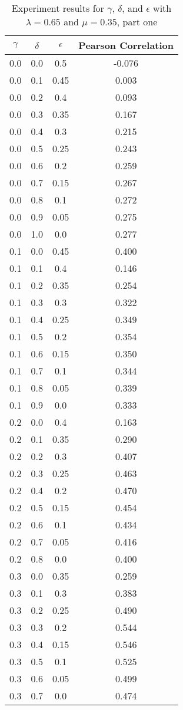 \documentclass{article}
\begin{document}
\begin{table}[h!]
\centering
\begin{tabular}{|c|c|c||c|}
	\hline
	$\gamma$ & $\delta$ & $\epsilon$ & Pearson Correlation \\
	\hline
	\hline
	0.0 & 0.0 & 0.5 & -0.076 \\
	0.0 & 0.1 & 0.45 & 0.003 \\
	0.0 & 0.2 & 0.4 & 0.093 \\
	0.0 & 0.3 & 0.35 & 0.167 \\
	0.0 & 0.4 & 0.3 & 0.215 \\ 
	0.0 & 0.5 & 0.25 & 0.243 \\
	0.0 & 0.6 & 0.2 & 0.259 \\
	0.0 & 0.7 & 0.15 & 0.267 \\
	0.0 & 0.8 & 0.1 & 0.272 \\
	0.0 & 0.9 & 0.05 & 0.275 \\
	0.0 & 1.0 & 0.0 & 0.277 \\
	\hline
	0.1 & 0.0 & 0.45 & 0.400 \\
	0.1 & 0.1 & 0.4 & 0.146 \\
	0.1 & 0.2 & 0.35 & 0.254 \\
	0.1 & 0.3 & 0.3 & 0.322 \\
	0.1 & 0.4 & 0.25 & 0.349 \\
	0.1 & 0.5 & 0.2 & 0.354 \\
	0.1 & 0.6 & 0.15 & 0.350 \\
	0.1 & 0.7 & 0.1 & 0.344 \\
	0.1 & 0.8 & 0.05 & 0.339 \\
	0.1 & 0.9 & 0.0 & 0.333 \\
	\hline
	0.2 & 0.0 & 0.4 & 0.163 \\
	0.2 & 0.1 & 0.35 & 0.290 \\
	0.2 & 0.2 & 0.3 & 0.407 \\
	0.2 & 0.3 & 0.25 & 0.463 \\
	0.2 & 0.4 & 0.2 & 0.470 \\
	0.2 & 0.5 & 0.15 & 0.454 \\
	0.2 & 0.6 & 0.1 & 0.434 \\
	0.2 & 0.7 & 0.05 & 0.416 \\
	0.2 & 0.8 & 0.0 & 0.400 \\
	\hline
	0.3 & 0.0 & 0.35 & 0.259 \\
	0.3 & 0.1 & 0.3 & 0.383 \\
	0.3 & 0.2 & 0.25 & 0.490 \\
	0.3 & 0.3 & 0.2 & 0.544 \\
	0.3 & 0.4 & 0.15 & 0.546 \\
	0.3 & 0.5 & 0.1 & 0.525 \\
	0.3 & 0.6 & 0.05 & 0.499 \\
	0.3 & 0.7 & 0.0 & 0.474 \\
	\hline
\end{tabular}
\caption{Experiment results for $\gamma$, $\delta$, and $\epsilon$ with $\lambda = 0.65$ and $\mu = 0.35$, part one}
\label{table:gammaresults1}
\end{table}
\end{document}
